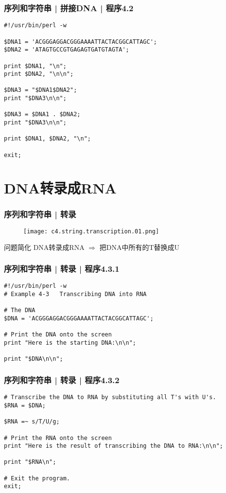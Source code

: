 \begin{frame}[fragile]
  \frametitle{序列和字符串 | 拼接DNA | \alert{程序4.2}}
\begin{lstlisting}[basicstyle=\small\tt]
#!/usr/bin/perl -w

$DNA1 = 'ACGGGAGGACGGGAAAATTACTACGGCATTAGC';
$DNA2 = 'ATAGTGCCGTGAGAGTGATGTAGTA';

print $DNA1, "\n";
print $DNA2, "\n\n";

$DNA3 = "$DNA1$DNA2";
print "$DNA3\n\n";

$DNA3 = $DNA1 . $DNA2;
print "$DNA3\n\n";

print $DNA1, $DNA2, "\n";

exit;
\end{lstlisting}
\end{frame}

\section{DNA转录成RNA}
\begin{frame}
  \frametitle{序列和字符串 | 转录}
  \begin{figure}
    \centering
    \texttt{[image: c4.string.transcription.01.png]}
  \end{figure}
  \pause
  \begin{block}{问题简化}
    DNA转录成RNA $\Longrightarrow$ 把DNA中所有的T替换成U
  \end{block}
\end{frame}

\begin{frame}[fragile,label=exam4.3.1]
  \frametitle{序列和字符串 | 转录 | 程序4.3.1}
\begin{lstlisting}
#!/usr/bin/perl -w
# Example 4-3   Transcribing DNA into RNA

# The DNA
$DNA = 'ACGGGAGGACGGGAAAATTACTACGGCATTAGC';

# Print the DNA onto the screen
print "Here is the starting DNA:\n\n";

print "$DNA\n\n";
\end{lstlisting}
\end{frame}

\begin{frame}[fragile,label=exam4.3.2]
  \frametitle{序列和字符串 | 转录 | 程序4.3.2}
\begin{lstlisting}[firstnumber=12]
# Transcribe the DNA to RNA by substituting all T's with U's.
$RNA = $DNA;

$RNA =~ s/T/U/g;

# Print the RNA onto the screen
print "Here is the result of transcribing the DNA to RNA:\n\n";

print "$RNA\n";

# Exit the program.
exit;
\end{lstlisting}
\end{frame}

